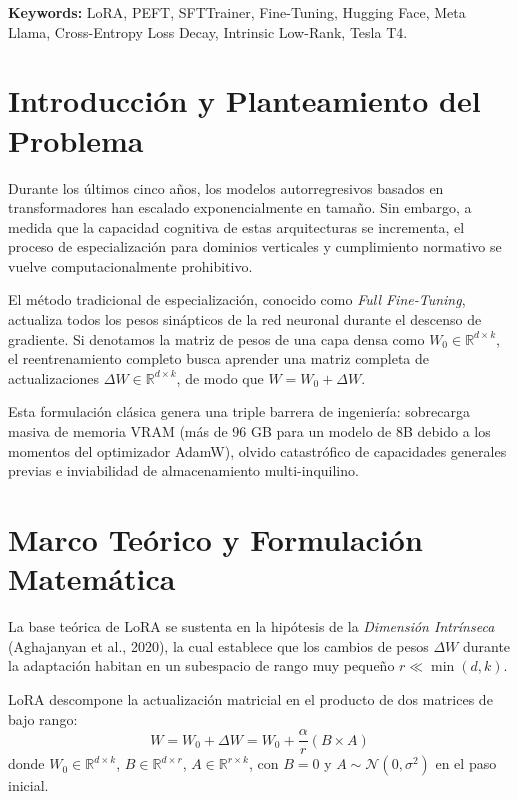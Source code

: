 \documentclass[12pt,letterpaper]{article}
\begin{document}
\vspace{0.5cm}
\noindent\textbf{Keywords:} LoRA, PEFT, SFTTrainer, Fine-Tuning, Hugging Face, Meta Llama, Cross-Entropy Loss Decay, Intrinsic Low-Rank, Tesla T4.

\newpage

\section{Introducción y Planteamiento del Problema}
Durante los últimos cinco años, los modelos autorregresivos basados en transformadores han escalado exponencialmente en tamaño. Sin embargo, a medida que la capacidad cognitiva de estas arquitecturas se incrementa, el proceso de especialización para dominios verticales y cumplimiento normativo se vuelve computacionalmente prohibitivo.

El método tradicional de especialización, conocido como \textit{Full Fine-Tuning}, actualiza todos los pesos sinápticos de la red neuronal durante el descenso de gradiente. Si denotamos la matriz de pesos de una capa densa como $W_0 \in \mathbb{R}^{d \times k}$, el reentrenamiento completo busca aprender una matriz completa de actualizaciones $\Delta W \in \mathbb{R}^{d \times k}$, de modo que $W = W_0 + \Delta W$.

Esta formulación clásica genera una triple barrera de ingeniería: sobrecarga masiva de memoria VRAM (más de 96 GB para un modelo de 8B debido a los momentos del optimizador AdamW), olvido catastrófico de capacidades generales previas e inviabilidad de almacenamiento multi-inquilino.

\section{Marco Teórico y Formulación Matemática}
La base teórica de LoRA se sustenta en la hipótesis de la \textit{Dimensión Intrínseca} (Aghajanyan et al., 2020), la cual establece que los cambios de pesos $\Delta W$ durante la adaptación habitan en un subespacio de rango muy pequeño $r \ll \min(d, k)$.

LoRA descompone la actualización matricial en el producto de dos matrices de bajo rango:
\begin{equation}
W = W_0 + \Delta W = W_0 + \frac{\alpha}{r} (B \times A)
\end{equation}
donde $W_0 \in \mathbb{R}^{d \times k}$, $B \in \mathbb{R}^{d \times r}$, $A \in \mathbb{R}^{r \times k}$, con $B=0$ y $A \sim \mathcal{N}(0, \sigma^2)$ en el paso inicial.
\end{document}
